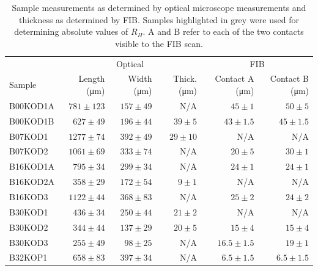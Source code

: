 \begin{table}
    \begin{center}
           \caption{Sample measurements as determined by optical microscope measurements and thickness as determined by \ac{FIB}. Samples highlighted in grey were used for determining absolute values of $R_H$. A and B refer to each of the two contacts visible to the \acs{FIB} scan.}
        {\small \begin{tabular}[htbp]{lrrrrr}
\toprule
	& \multicolumn{3}{c}{Optical}			& \multicolumn{2}{c}{\acs{FIB}}		\\
Sample  & Length (\unit{\micro\metre})	& Width (\unit{\micro\metre})		& Thick. (\unit{\micro\metre})	& Contact A (\unit{\micro\metre})    & Contact B (\unit{\micro\metre})    		\\

\midrule
\cellcolor[gray]{0.9}B00KOD1A	& \cellcolor[gray]{0.9}$781\pm123$	& \cellcolor[gray]{0.9}$157\pm49$	& \cellcolor[gray]{0.9}N/A		& \cellcolor[gray]{0.9}$45\pm1$	& \cellcolor[gray]{0.9}$50\pm5$	\\
B00KOD1B	& $627\pm49$	& $196\pm44$	& $39\pm5$ 	& $43\pm1.5$	& $45\pm1.5$	\\
B07KOD1		& $1277\pm74$	& $392\pm49$	& $29\pm10$	& N/A		& N/A		\\
\cellcolor[gray]{0.9}B07KOD2		& \cellcolor[gray]{0.9}$1061\pm69$	& \cellcolor[gray]{0.9}$333\pm74$	& \cellcolor[gray]{0.9}N/A		& \cellcolor[gray]{0.9}$20\pm5$ 	& \cellcolor[gray]{0.9}$30\pm1$ 	\\
\cellcolor[gray]{0.9}B16KOD1A	& \cellcolor[gray]{0.9}$795\pm34$	& \cellcolor[gray]{0.9}$299\pm34$	& \cellcolor[gray]{0.9}N/A		& \cellcolor[gray]{0.9}$24\pm1$ 	& \cellcolor[gray]{0.9}$24\pm1$ 	\\
B16KOD2A	& $358\pm29$	& $172\pm54$	& $9\pm1$ 	& N/A		& N/A		\\
B16KOD3		& $1122\pm44$	& $368\pm83$	& N/A		& $25\pm2$ 	& $24\pm2$ 	\\
B30KOD1	 	& $436\pm34$	& $250\pm44$	& $21\pm2$ 	& N/A		& N/A		\\
B30KOD2		& $344\pm44$	& $137\pm29$	& $20\pm5$ 	& $15\pm4$	& $15\pm4$	\\
\cellcolor[gray]{0.9}B30KOD3 	& \cellcolor[gray]{0.9}$255\pm49$	& \cellcolor[gray]{0.9}$98\pm25$ 	& \cellcolor[gray]{0.9}N/A		& \cellcolor[gray]{0.9}$16.5\pm1.5$	& \cellcolor[gray]{0.9}$19\pm1$	\\
\cellcolor[gray]{0.9}B32KOP1 	& \cellcolor[gray]{0.9}$658\pm83$	& \cellcolor[gray]{0.9}$397\pm34$	& \cellcolor[gray]{0.9}N/A		& \cellcolor[gray]{0.9}$6.5\pm1.5$	& \cellcolor[gray]{0.9}$6.5\pm1.5$	\\

\end{tabular}}
\end{center}
\end{table}
